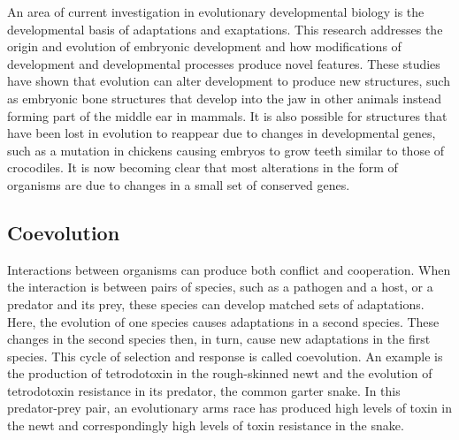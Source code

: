 An area of current investigation in evolutionary developmental biology is the developmental basis of adaptations and exaptations. This research addresses the origin and evolution of embryonic development and how modifications of development and developmental processes produce novel features. These studies have shown that evolution can alter development to produce new structures, such as embryonic bone structures that develop into the jaw in other animals instead forming part of the middle ear in mammals. It is also possible for structures that have been lost in evolution to reappear due to changes in developmental genes, such as a mutation in chickens causing embryos to grow teeth similar to those of crocodiles. It is now becoming clear that most alterations in the form of organisms are due to changes in a small set of conserved genes.

\hypertarget{coevolution}{%
\subsection{Coevolution}\label{coevolution}}

Interactions between organisms can produce both conflict and cooperation. When the interaction is between pairs of species, such as a pathogen and a host, or a predator and its prey, these species can develop matched sets of adaptations. Here, the evolution of one species causes adaptations in a second species. These changes in the second species then, in turn, cause new adaptations in the first species. This cycle of selection and response is called coevolution. An example is the production of tetrodotoxin in the rough-skinned newt and the evolution of tetrodotoxin resistance in its predator, the common garter snake. In this predator-prey pair, an evolutionary arms race has produced high levels of toxin in the newt and correspondingly high levels of toxin resistance in the snake.


